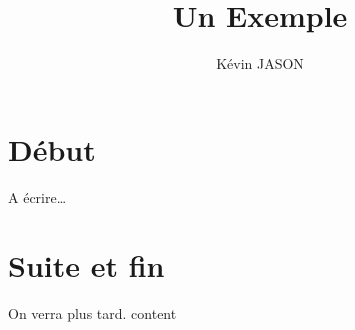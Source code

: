 \documentclass[a4paper,11pt]{article}
\author{Kévin JASON}
\title{Un Exemple}
\begin{document}
\maketitle
\tableofcontents
\section{Début}
A écrire\dots
\section{Suite et fin}
On verra plus tard.
content
\end{document}

